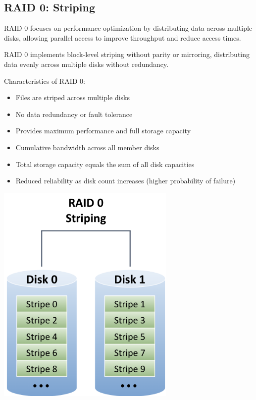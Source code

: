 \documentclass[../../compsys.tex]{subfiles}
\begin{document}
\subsection{RAID 0: Striping}
RAID 0 focuses on performance optimization by distributing data across multiple disks, allowing parallel access to improve throughput and reduce access times.

\begin{definition}[RAID 0]
RAID 0 implements block-level striping without parity or mirroring, distributing data evenly across multiple disks without redundancy.
\end{definition}

\begin{minipage}{0.45\textwidth}

    Characteristics of RAID 0:
    \begin{itemize}
        \item Files are striped across multiple disks
        \item No data redundancy or fault tolerance
        \item Provides maximum performance and full storage capacity
        \item Cumulative bandwidth across all member disks
        \item Total storage capacity equals the sum of all disk capacities
        \item Reduced reliability as disk count increases (higher probability of failure)
    \end{itemize}
\end{minipage}
\hfill
\vline
\hfill
\begin{minipage}{0.45\textwidth}
    \begin{center}
        \includegraphics[width=0.65\textwidth]{chapters/L8/images/raid0.png}
    \end{center}
\end{minipage}
\end{document}
